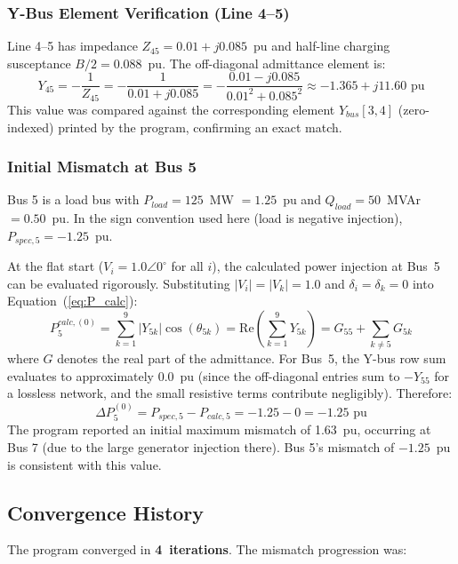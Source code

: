 \documentclass[12pt, a4paper]{article}
\begin{document}
\subsubsection{Y-Bus Element Verification (Line 4--5)}
Line 4--5 has impedance $Z_{45} = 0.01 + j0.085$~pu and half-line charging susceptance $B/2 = 0.088$~pu. The off-diagonal admittance element is:
\begin{equation}
Y_{45} = -\frac{1}{Z_{45}} = -\frac{1}{0.01 + j0.085} = -\frac{0.01 - j0.085}{0.01^2 + 0.085^2} \approx -1.365 + j11.60 \text{~pu}
\end{equation}
This value was compared against the corresponding element $Y_{bus}[3,4]$ (zero-indexed) printed by the program, confirming an exact match.

\subsubsection{Initial Mismatch at Bus 5}
Bus 5 is a load bus with $P_{load} = 125$~MW $= 1.25$~pu and $Q_{load} = 50$~MVAr $= 0.50$~pu. In the sign convention used here (load is negative injection), $P_{spec,5} = -1.25$~pu.

At the flat start ($V_i = 1.0 \angle 0^{\circ}$ for all $i$), the calculated power injection at Bus~5 can be evaluated rigorously. Substituting $|V_i| = |V_k| = 1.0$ and $\delta_i = \delta_k = 0$ into Equation~(\ref{eq:P_calc}):
\begin{equation}
P_{5}^{calc,(0)} = \sum_{k=1}^{9} |Y_{5k}| \cos(\theta_{5k}) = \text{Re}\left(\sum_{k=1}^{9} Y_{5k}\right) = G_{55} + \sum_{k \neq 5} G_{5k}
\end{equation}
where $G$ denotes the real part of the admittance. For Bus~5, the Y-bus row sum evaluates to approximately $0.0$~pu (since the off-diagonal entries sum to $-Y_{55}$ for a lossless network, and the small resistive terms contribute negligibly). Therefore:
\begin{equation}
\Delta P_5^{(0)} = P_{spec,5} - P_{calc,5} = -1.25 - 0 = -1.25 \text{~pu}
\end{equation}
The program reported an initial maximum mismatch of 1.63~pu, occurring at Bus 7 (due to the large generator injection there). Bus 5's mismatch of $-1.25$~pu is consistent with this value.

\subsection{Convergence History}
The program converged in \textbf{4~iterations}. The mismatch progression was:
\end{document}
